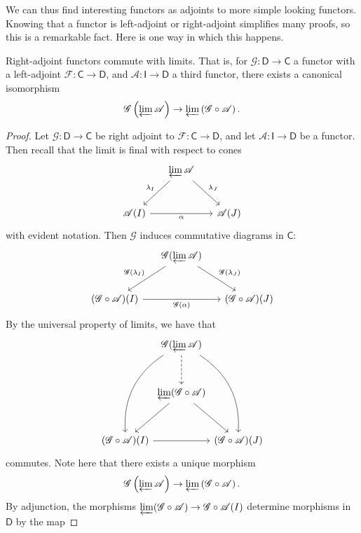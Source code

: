We can thus find interesting functors as adjoints to more simple looking functors. Knowing that a functor is left-adjoint or right-adjoint simplifies many proofs, so this is a remarkable fact. Here is one way in which this happens.
\begin{lemma}\label{lma:8.1}
	Right-adjoint functors commute with limits. That is, for $\mathscr{G} : \mathsf{D}  \to \mathsf{C} $ a functor with a left-adjoint $\mathscr{F} : \mathsf{C}  \to \mathsf{D} $, and $\mathscr{A} : \mathsf{I}  \to \mathsf{D} $ a third functor, there exists a canonical isomorphism
	\[
		\mathscr{G} \left( \varprojlim \mathscr{A}  \right) \to \varprojlim \left( \mathscr{G} \circ \mathscr{A}  \right) 
	.\]
\end{lemma}
\begin{proof}
Let $\mathscr{G} : \mathsf{D}  \to \mathsf{C} $ be right adjoint to $\mathscr{F} : \mathsf{C}  \to \mathsf{D} $, and let $\mathscr{A} : \mathsf{I}  \to \mathsf{D} $ be a functor. Then recall that the limit is final with respect to cones
\[\begin{tikzcd}[row sep = 2.5em, column sep = 1.5em]
	&\varprojlim \mathscr{A} \arrow[dl, "\lambda_I"']\arrow[dr, "\lambda_J"]\\
	\mathscr{A} (I)\arrow[rr, "\alpha "']&&\mathscr{A} (J)
\end{tikzcd}\]
with evident notation. Then $\mathscr{G} $ induces commutative diagrams in $\mathsf{C} $:
\[\begin{tikzcd}[row sep = 2.5em, column sep = 1.5em]
	&\mathscr{G} (\varprojlim \mathscr{A}) \arrow[dl, "\mathscr{G} (\lambda_I)"']\arrow[dr, "\mathscr{G} (\lambda_J)"]\\
	(\mathscr{G} \circ \mathscr{A}) (I)\arrow[rr, "\mathscr{G} (\alpha )"']&&(\mathscr{G} \circ \mathscr{A}) (J)
\end{tikzcd}\]
By the universal property of limits, we have that
\[\begin{tikzcd}[row sep = 3em, column sep = 0em]
	&\mathscr{G} (\varprojlim \mathscr{A}) \arrow[d, dashed]\arrow[ddr, bend left]\arrow[ddl, bend right]\\
	&\varprojlim (\mathscr{G} \circ \mathscr{A} )\arrow[dl]\arrow[dr]\\
	(\mathscr{G} \circ \mathscr{A}) (I)\arrow[rr]&&(\mathscr{G} \circ \mathscr{A}) (J)
\end{tikzcd}\]
commutes. Note here that there exists a unique morphism
\[
	\mathscr{G} \left( \varprojlim \mathscr{A}  \right)  \to \varprojlim \left( \mathscr{G} \circ \mathscr{A}  \right) 
.\]
By adjunction, the morphisms $\varprojlim (\mathscr{G} \circ \mathscr{A} )\to \mathscr{G} \circ \mathscr{A} (I)$ determine morphisms in $\mathsf{D} $ by the map

\end{proof}
